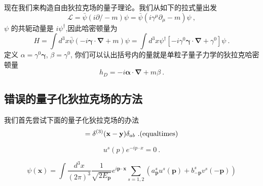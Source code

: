 
现在我们来构造自由狄拉克场的量子理论。我们从如下的拉式量出发
\begin{equation}
\mathcal L = \bar \psi (i \partial\!\!\!/ - m)\psi = \bar \psi (i \gamma^\mu \partial_\mu - m)\psi~,
\end{equation}
$\psi$ 的共轭动量是 $i\psi^\dagger$,因此哈密顿量为
\begin{equation}
H = \int d^3 x \bar \psi (-i \boldsymbol \gamma \cdot \boldsymbol \nabla + m)\psi = \int d^3 x \psi^\dagger [-i\gamma^0\boldsymbol\gamma \cdot \boldsymbol\nabla + \gamma^0]\psi ~.
\end{equation}
定义 $\alpha = \gamma^0 \boldsymbol\gamma$, $\beta = \gamma^0$, 你们可以认出括号内的量就是单粒子量子力学的狄拉克哈密顿量
\begin{equation}
h_D = - i \boldsymbol\alpha \cdot \boldsymbol \nabla + m \beta ~.
\end{equation} 

\subsection{错误的量子化狄拉克场的方法}
我们首先尝试下面的量子化狄拉克场的办法
\begin{equation}
[\psi_a(\mathbf x),\psi_b^\dagger(\mathbf y)] = \delta^{(3)}(\mathbf x - \mathbf y)\delta_{ab}~. {\rm (equal times)}
\end{equation}

\begin{equation}
[i\gamma^0\partial_0+i\boldsymbol \gamma \cdot \nabla - m ] u^s (p) e^{-ip\cdot x} = 0~.
\end{equation}

\begin{equation}
\psi(\mathbf x)= \int \frac{d^3 x}{(2\pi)^3} \frac{1}{\sqrt{2 E_{\mathbf p}}} e^{i \mathbf p \cdot \mathbf x} \sum_{s = 1,2} (a_{\mathbf p}^s u^s(\mathbf p)+ b_{-\mathbf p}^s v^s(-\mathbf p))
\end{equation}
